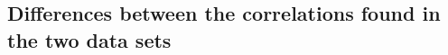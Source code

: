 \subsection{Differences between the correlations found in the two data sets}
\label{heinemannchemo} 